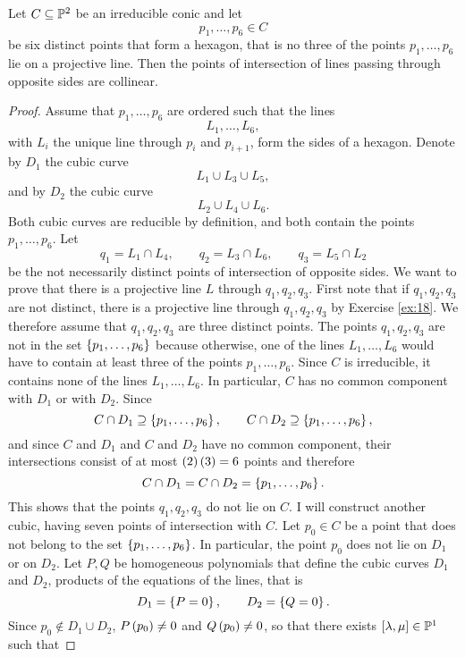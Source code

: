 \begin{proposition}
Let $ C \subseteq \P^2 $ be an irreducible conic and let
$$ p_1, \dots, p_6 \in C $$
be six distinct points that form a hexagon, that is no three of the points $ p_1, \dots, p_6 $ lie on a projective line. Then the points of intersection of lines passing through opposite sides are collinear.
\end{proposition}

\begin{proof}
Assume that $ p_1, \dots, p_6 $ are ordered such that the lines
$$ L_1, \dots, L_6, $$
with $ L_i $ the unique line through $ p_i $ and $ p_{i + 1} $, form the sides of a hexagon. Denote by $ D_1 $ the cubic curve
$$ L_1 \cup L_3 \cup L_5, $$
and by $ D_2 $ the cubic curve
$$ L_2 \cup L_4 \cup L_6. $$
Both cubic curves are reducible by definition, and both contain the points $ p_1, \dots, p_6 $. Let
$$ q_1 = L_1 \cap L_4, \qquad q_2 = L_3 \cap L_6, \qquad q_3 = L_5 \cap L_2 $$
be the not necessarily distinct points of intersection of opposite sides. We want to prove that there is a projective line $ L $ through $ q_1, q_2, q_3 $. First note that if $ q_1, q_2, q_3 $ are not distinct, there is a projective line through $ q_1, q_2, q_3 $ by Exercise \ref{ex:18}. We therefore assume that $ q_1, q_2, q_3 $ are three distinct points. The points $ q_1, q_2, q_3 $ are not in the set $ \cb{p_1, \dots, p_6} $ because otherwise, one of the lines $ L_1, \dots, L_6 $ would have to contain at least three of the points $ p_1, \dots, p_6 $. Since $ C $ is irreducible, it contains none of the lines $ L_1, \dots, L_6 $. In particular, $ C $ has no common component with $ D_1 $ or with $ D_2 $. Since
$$ C \cap D_1 \supseteq \cb{p_1, \dots, p_6}, \qquad C \cap D_2 \supseteq \cb{p_1, \dots, p_6}, $$
and since $ C $ and $ D_1 $ and $ C $ and $ D_2 $ have no common component, their intersections consist of at most $ \rb{2}\rb{3} = 6 $ points and therefore
$$ C \cap D_1 = C \cap D_2 = \cb{p_1, \dots, p_6}. $$
This shows that the points $ q_1, q_2, q_3 $ do not lie on $ C $. I will construct another cubic, having seven points of intersection with $ C $. Let $ p_0 \in C $ be a point that does not belong to the set $ \cb{p_1, \dots, p_6} $. In particular, the point $ p_0 $ does not lie on $ D_1 $ or on $ D_2 $. Let $ P, Q $ be homogeneous polynomials that define the cubic curves $ D_1 $ and $ D_2 $, products of the equations of the lines, that is
$$ D_1 = \cb{P = 0}, \qquad D_2 = \cb{Q = 0}. $$
Since $ p_0 \notin D_1 \cup D_2 $, $ P\rb{p_0} \ne 0 $ and $ Q\rb{p_0} \ne 0 $, so that there exists $ \sb{\lambda, \mu} \in \P^1 $ such that

\end{proof}
